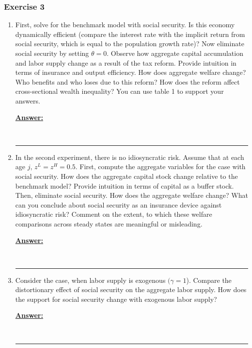 \documentclass{article} %
\theoremstyle{definition}
\newenvironment{solution}[1][Answer]{\begin{singlespace}\underline{\textbf{#1:}}\quad }{\ \rule{0.3em}{0.3em}\end{singlespace}} %
\begin{document}
	\subsubsection*{Exercise 3}
	\begin{enumerate}
		\item First, solve for the benchmark model with social security. Is this economy dynamically efficient (compare the interest rate with the implicit return from social security, which is equal to the population growth
		rate)? Now eliminate social security by setting $ \theta = 0 $. Observe how aggregate capital accumulation and labor supply change as a result of the tax reform. Provide intuition in terms of insurance and output efficiency. How does aggregate welfare change? Who benefits and who loses due to this reform? How does the reform affect cross-sectional wealth inequality? You can use table 1 to support your answers.
		\begin{solution}
			
		\end{solution}
		\item In the second experiment, there is no idiosyncratic risk. Assume that at each age $ j $, $ z^L = z^H = 0.5. $ First, compute the aggregate variables for the case with social security. How does the aggregate capital stock change relative to the benchmark model? Provide intuition in terms of capital as a buffer stock. Then, eliminate social security. How does the aggregate welfare change? What can you conclude about social security as an insurance device against idiosyncratic risk? Comment on the extent, to which these welfare comparisons across steady states are meaningful or misleading.
		\begin{solution}
			
		\end{solution}
		
		\item Consider the case, when labor supply is exogenous $ (\gamma = 1 $). Compare the distortionary effect of social security on the aggregate labor supply. How does the support for social security change with exogenous labor supply?
		\begin{solution}
			
		\end{solution}
	\end{enumerate}
\end{document}
